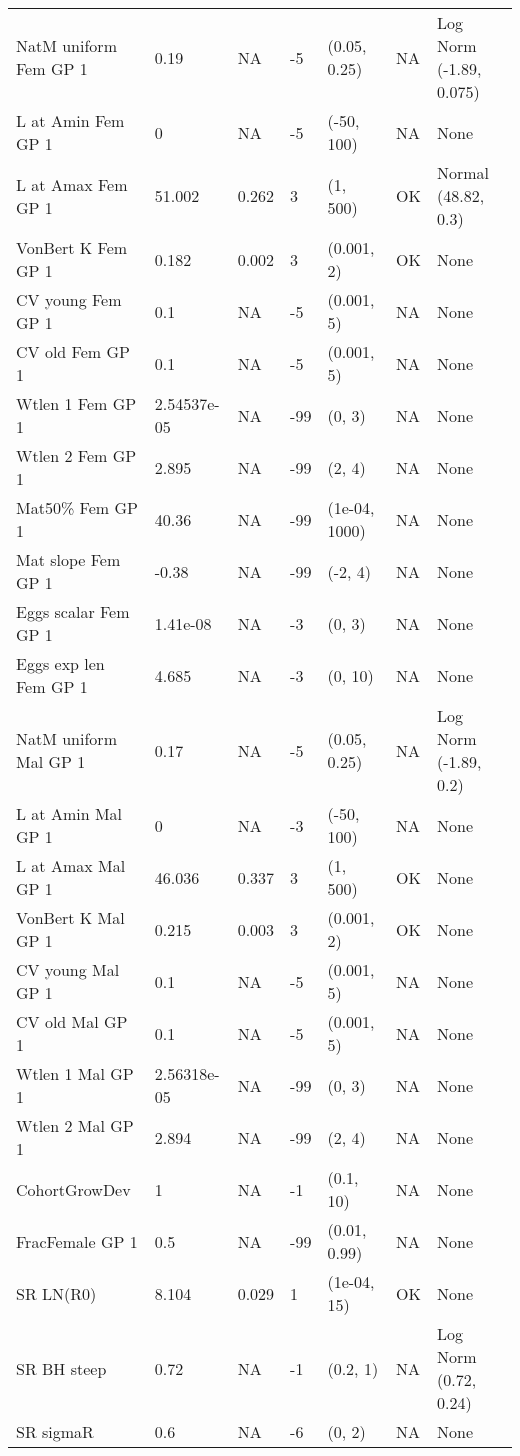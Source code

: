 \documentclass[11pt,
  english,
  letterpaper,
]{article}
\begin{document}
\begin{landscape}
\begin{longtable}[t]{>{\raggedright\arraybackslash}p{7.5cm}lllll>{\raggedright\arraybackslash}p{3.5cm}}
\endfoot
\bottomrule
\endlastfoot
NatM uniform Fem GP 1 & 0.19 & NA & -5 & (0.05, 0.25) & NA & Log Norm (-1.89, 0.075)\\
L at Amin Fem GP 1 & 0 & NA & -5 & (-50, 100) & NA & None\\
L at Amax Fem GP 1 & 51.002 & 0.262 & 3 & (1, 500) & OK & Normal (48.82, 0.3)\\
VonBert K Fem GP 1 & 0.182 & 0.002 & 3 & (0.001, 2) & OK & None\\
CV young Fem GP 1 & 0.1 & NA & -5 & (0.001, 5) & NA & None\\
CV old Fem GP 1 & 0.1 & NA & -5 & (0.001, 5) & NA & None\\
Wtlen 1 Fem GP 1 & 2.54537e-05 & NA & -99 & (0, 3) & NA & None\\
Wtlen 2 Fem GP 1 & 2.895 & NA & -99 & (2, 4) & NA & None\\
Mat50\% Fem GP 1 & 40.36 & NA & -99 & (1e-04, 1000) & NA & None\\
Mat slope Fem GP 1 & -0.38 & NA & -99 & (-2, 4) & NA & None\\
Eggs scalar Fem GP 1 & 1.41e-08 & NA & -3 & (0, 3) & NA & None\\
Eggs exp len Fem GP 1 & 4.685 & NA & -3 & (0, 10) & NA & None\\
NatM uniform Mal GP 1 & 0.17 & NA & -5 & (0.05, 0.25) & NA & Log Norm (-1.89, 0.2)\\
L at Amin Mal GP 1 & 0 & NA & -3 & (-50, 100) & NA & None\\
L at Amax Mal GP 1 & 46.036 & 0.337 & 3 & (1, 500) & OK & None\\
VonBert K Mal GP 1 & 0.215 & 0.003 & 3 & (0.001, 2) & OK & None\\
CV young Mal GP 1 & 0.1 & NA & -5 & (0.001, 5) & NA & None\\
CV old Mal GP 1 & 0.1 & NA & -5 & (0.001, 5) & NA & None\\
Wtlen 1 Mal GP 1 & 2.56318e-05 & NA & -99 & (0, 3) & NA & None\\
Wtlen 2 Mal GP 1 & 2.894 & NA & -99 & (2, 4) & NA & None\\
CohortGrowDev & 1 & NA & -1 & (0.1, 10) & NA & None\\
FracFemale GP 1 & 0.5 & NA & -99 & (0.01, 0.99) & NA & None\\
SR LN(R0) & 8.104 & 0.029 & 1 & (1e-04, 15) & OK & None\\
SR BH steep & 0.72 & NA & -1 & (0.2, 1) & NA & Log Norm (0.72, 0.24)\\
SR sigmaR & 0.6 & NA & -6 & (0, 2) & NA & None\\

\end{longtable}
\end{landscape}
\end{document}
